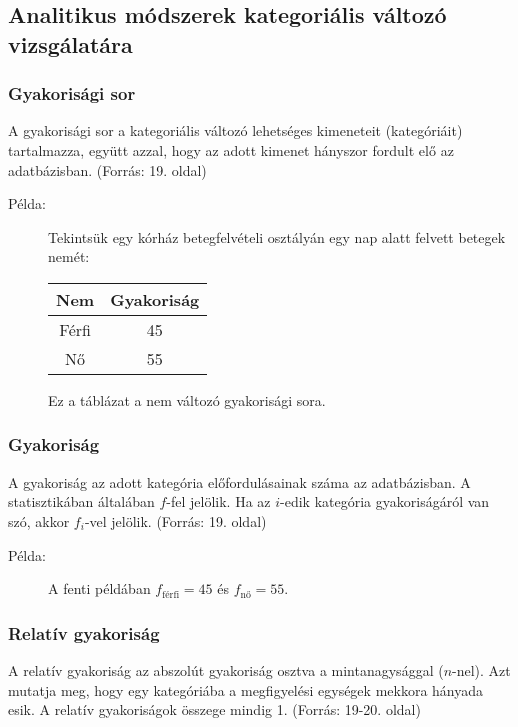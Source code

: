 \documentclass[a4paper,12pt]{article}
\begin{document}
    \subsection{Analitikus módszerek kategoriális változó vizsgálatára}

    \subsubsection{Gyakorisági sor}
    A gyakorisági sor a kategoriális változó lehetséges kimeneteit (kategóriáit) tartalmazza, együtt azzal, hogy az adott kimenet hányszor fordult elő az adatbázisban.
    (Forrás: 19. oldal)

    \begin{description}
        \item[Példa:] Tekintsük egy kórház betegfelvételi osztályán egy nap alatt felvett betegek nemét:
        \begin{center}
            \begin{tabular}{|c|c|}
                \hline
                Nem   & Gyakoriság \\
                \hline
                Férfi & 45         \\
                Nő    & 55         \\
                \hline
            \end{tabular}
        \end{center}
        Ez a táblázat a nem változó gyakorisági sora.
    \end{description}

    \subsubsection{Gyakoriság}
    A gyakoriság az adott kategória előfordulásainak száma az adatbázisban. A statisztikában általában $f$-fel jelölik. Ha az $i$-edik kategória gyakoriságáról van szó, akkor $f_i$-vel jelölik.
    (Forrás: 19. oldal)

    \begin{description}
        \item[Példa:] A fenti példában $f_{\text{férfi}} = 45$ és $f_{\text{nő}} = 55$.
    \end{description}

    \subsubsection{Relatív gyakoriság}
    A relatív gyakoriság az abszolút gyakoriság osztva a mintanagysággal ($n$-nel). Azt mutatja meg, hogy egy kategóriába a megfigyelési egységek mekkora hányada esik. A relatív gyakoriságok összege mindig 1.
    (Forrás: 19-20. oldal)
\end{document}
